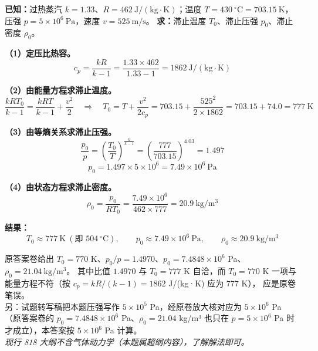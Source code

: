 \begin{jie}
\textbf{已知：}过热蒸汽 $k=1.33$、$R=462\ \mathrm{J/(kg\cdot K)}$；温度 $T=430\ ^{\circ}\mathrm{C}=703.15\ \mathrm{K}$，
压强 $p=5\times10^6\ \mathrm{Pa}$，速度 $v=525\ \mathrm{m/s}$。
\textbf{求：}滞止温度 $T_0$、滞止压强 $p_0$、滞止密度 $\rho_0$。

\textbf{（1）定压比热容。}
\[
c_p=\frac{kR}{k-1}=\frac{1.33\times462}{1.33-1}=1862\ \mathrm{J/(kg\cdot K)}
\]

\textbf{（2）由能量方程求滞止温度。}
\[
\frac{kRT_0}{k-1}=\frac{kRT}{k-1}+\frac{v^2}{2}
\quad\Longrightarrow\quad
T_0=T+\frac{v^2}{2c_p}
=703.15+\frac{525^2}{2\times1862}=703.15+74.0=777\ \mathrm{K}
\]

\textbf{（3）由等熵关系求滞止压强。}
\[
\frac{p_0}{p}=\left(\frac{T_0}{T}\right)^{\frac{k}{k-1}}
=\left(\frac{777}{703.15}\right)^{4.03}=1.497
\]
\[
p_0=1.497\times5\times10^6=7.49\times10^6\ \mathrm{Pa}
\]

\textbf{（4）由状态方程求滞止密度。}
\[
\rho_0=\frac{p_0}{RT_0}=\frac{7.49\times10^6}{462\times777}=20.9\ \mathrm{kg/m^3}
\]

\textbf{结果：}
\[
\boxed{T_0\approx777\ \mathrm{K}\ (\text{即 }504\ ^{\circ}\mathrm{C}),\qquad
p_0\approx7.49\times10^6\ \mathrm{Pa},\qquad
\rho_0\approx20.9\ \mathrm{kg/m^3}}
\]
\end{jie}

\begin{tishi}
原答案卷给出 $T_0=770$ K、$p_0/p=1.4970$、$p_0=7.4848\times10^6$ Pa、$\rho_0=21.04\ \mathrm{kg/m^3}$。
其中比值 $1.4970$ 与 $T_0=777$ K 自洽，而 $T_0=770$ K 一项与能量方程不符（按 $c_p=kR/(k-1)=1862$ J/(kg·K) 应为 $777$ K），
应是原卷笔误。\\
另：试题转写稿把本题压强写作 $5\times10^5$ Pa，经原卷放大核对应为 $5\times10^6$ Pa
（原答案卷的 $p_0=7.4848\times10^6$ Pa、$\rho_0=21.04$ kg/m³ 也只在 $p=5\times10^6$ Pa 时才成立），本答案按 $5\times10^6$ Pa 计算。\\
\emph{现行 818 大纲不含气体动力学（本题属超纲内容），了解解法即可。}
\end{tishi}


